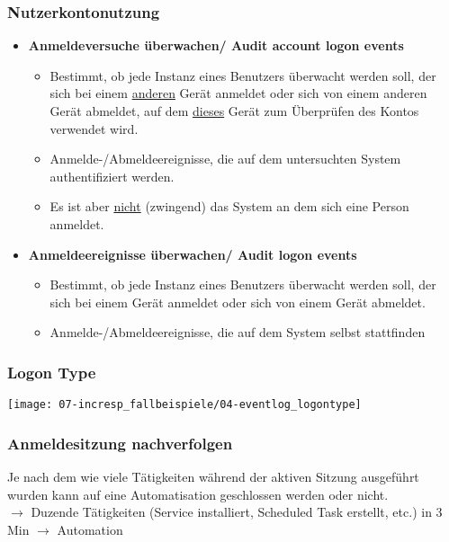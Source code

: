 \subsubsection{Nutzerkontonutzung}
\begin{itemize}
    \item \textbf{Anmeldeversuche überwachen/ Audit account logon events}
    \begin{itemize}
        \item Bestimmt, ob jede Instanz eines Benutzers überwacht werden soll, der sich bei einem \underline{anderen} Gerät anmeldet oder sich von einem anderen Gerät abmeldet, auf dem \underline{dieses} Gerät zum Überprüfen des Kontos verwendet wird.
        \item Anmelde-/Abmeldeereignisse, die auf dem untersuchten System authentifiziert werden.
        \item Es ist aber \underline{nicht} (zwingend) das System an dem sich eine Person anmeldet.
    \end{itemize}
    \item \textbf{Anmeldeereignisse überwachen/ Audit logon events}
    \begin{itemize}
        \item Bestimmt, ob jede Instanz eines Benutzers überwacht werden soll, der sich bei einem Gerät anmeldet oder sich von einem Gerät abmeldet.
        \item Anmelde-/Abmeldeereignisse, die auf dem System selbst stattfinden
    \end{itemize}
\end{itemize}

\subsubsection{Logon Type}
\begin{center}
    \texttt{[image: 07-incresp\_fallbeispiele/04-eventlog\_logontype]}
\end{center}

\subsubsection{Anmeldesitzung nachverfolgen}
Je nach dem wie viele Tätigkeiten während der aktiven Sitzung ausgeführt wurden kann auf eine Automatisation geschlossen werden oder nicht. \\
$\rightarrow$ Duzende Tätigkeiten (Service installiert, Scheduled Task erstellt, etc.) in 3 Min $\rightarrow$ Automation

